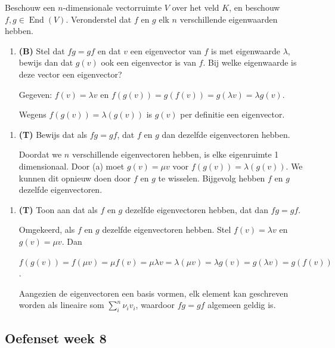 \begin{oefening}[6.3.6]
    Beschouw een $n$-dimensionale vectorruimte $V$ over het veld $K$, en beschouw $f, g \in \operatorname{End}(V)$. Veronderstel dat $f$ en $g$ elk $n$ verschillende eigenwaarden hebben.
    \begin{enumerate}
        \item[(a)] \textbf{(B)} Stel dat $fg = gf$ en dat $v$ een eigenvector van $f$ is met eigenwaarde $\lambda$, bewijs dan dat $g(v)$ ook een eigenvector is van $f$. Bij welke eigenwaarde is deze vector een eigenvector?

        Gegeven: \(f(v) = \lambda v\) en \(f(g(v)) = g(f(v)) = g(\lambda v) = \lambda g(v)\).

        Wegens \(f(g(v)) = \lambda(g(v))\) is \(g(v)\) per definitie een eigenvector.
    \end{enumerate}
     \begin{enumerate}
        \item[(b)] \textbf{(T)} Bewijs dat als $fg = gf$, dat $f$ en $g$ dan dezelfde eigenvectoren hebben.

        Doordat we \(n\) verschillende eigenvectoren hebben, is elke eigenruimte 1 dimensionaal.
        Door (a) moet \(g(v) = \mu v\) voor \(f(g(v)) = \lambda(g(v))\).
        We kunnen dit opnieuw doen door \(f\) en \(g\) te wisselen.
        Bijgevolg hebben \(f\) en \(g\) dezelfde eigenvectoren.
    \end{enumerate}
    \begin{enumerate}
        \item[(c)] \textbf{(T)} Toon aan dat als $f$ en $g$ dezelfde eigenvectoren hebben, dat dan $fg = gf$.

        Omgekeerd, als $f$ en $g$ dezelfde eigenvectoren hebben.
        Stel \(f(v) = \lambda v\) en \(g(v) = \mu v\). Dan

        \(f(g(v))
        = f(\mu v)
        = \mu f(v)
        = \mu\lambda v
        = \lambda (\mu v)
        = \lambda g(v)
        = g(\lambda v)
        = g(f(v))
        \).

        Aangezien de eigenvectoren een basis vormen, elk element kan geschreven worden als lineaire som \(\sum_{i}^{n} \nu_i v_i\),
        waardoor \(fg=gf \) algemeen geldig is.
    \end{enumerate}
\end{oefening}

\subsection{Oefenset week 8}

